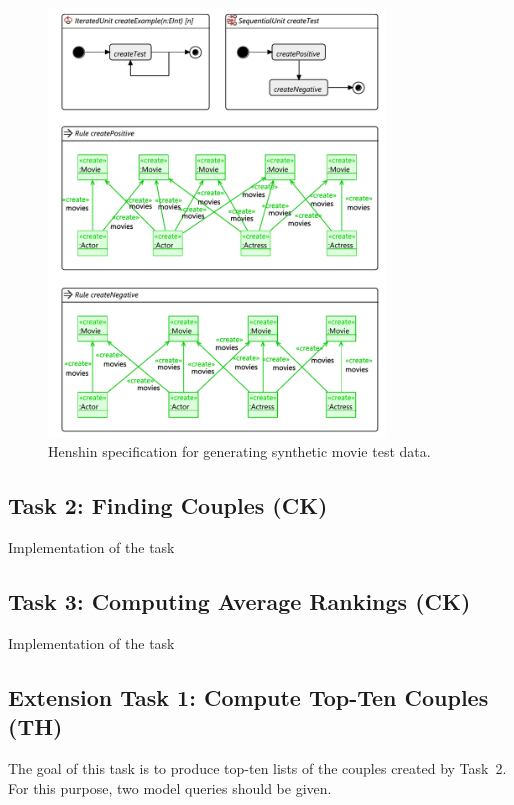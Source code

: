 \documentclass[a4paper,11pt]{article}
\begin{document}
\begin{figure}[p]
\centering
\includegraphics[width=0.8\textwidth]{gen-test-data}
\caption{Henshin specification for generating synthetic movie test data.}
\label{fig:gen-test-data}
\end{figure}

\subsection{Task 2: Finding Couples (CK)}

Implementation of the task


\subsection{Task 3: Computing Average Rankings (CK)}

Implementation of the task

\subsection{Extension Task 1: Compute Top-Ten Couples (TH)}

The goal of this task is to produce top-ten lists of the couples created by
Task~2.  For this purpose, two model queries should be given.
\end{document}
